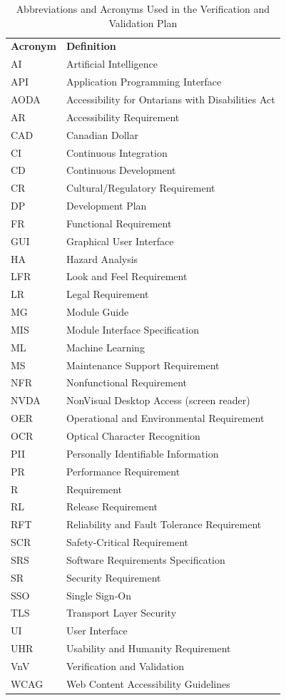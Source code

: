 \documentclass[12pt, titlepage]{article}
\begin{document}
\begin{table}[H]
\centering
\caption{Abbreviations and Acronyms Used in the Verification and Validation Plan}
\begin{tabular}{ll}

\textbf{Acronym} & \textbf{Definition} \\

AI & Artificial Intelligence \\
API & Application Programming Interface \\
AODA & Accessibility for Ontarians with Disabilities Act \\
AR & Accessibility Requirement \\
CAD & Canadian Dollar \\
CI & Continuous Integration \\
CD & Continuous Development \\
CR & Cultural/Regulatory Requirement \\
DP & Development Plan \\
FR & Functional Requirement \\
GUI & Graphical User Interface \\
HA & Hazard Analysis \\
LFR & Look and Feel Requirement \\
LR & Legal Requirement \\
MG & Module Guide \\
MIS & Module Interface Specification \\
ML & Machine Learning \\
MS & Maintenance Support Requirement \\
NFR & Nonfunctional Requirement \\
NVDA & NonVisual Desktop Access (screen reader) \\
OER & Operational and Environmental Requirement \\
OCR & Optical Character Recognition \\
PII & Personally Identifiable Information \\
PR & Performance Requirement \\
R & Requirement \\
RL & Release Requirement \\
RFT & Reliability and Fault Tolerance Requirement \\
SCR & Safety-Critical Requirement \\
SRS & Software Requirements Specification \\
SR & Security Requirement \\
SSO & Single Sign-On \\
TLS & Transport Layer Security \\
UI & User Interface \\
UHR & Usability and Humanity Requirement \\
VnV & Verification and Validation \\
WCAG & Web Content Accessibility Guidelines \\

\end{tabular}
\end{table}
\end{document}
